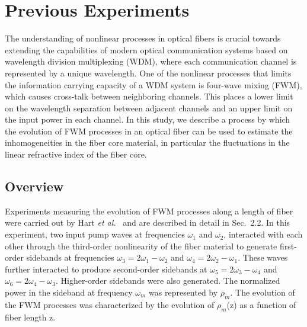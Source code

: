 \appendix
\renewcommand{\thechapter}{A}
\vspace*{-.85in}
\renewcommand{\chaptername}{Appendix}

\chapter{Previous Experiments}

The understanding of nonlinear processes in optical fibers is crucial towards
extending the capabilities of modern optical communication systems based on
wavelength division multiplexing (WDM), where each communication channel is
represented by a unique wavelength. One of the nonlinear processes that
limits the information carrying capacity of a WDM system is four-wave mixing
(FWM), which causes cross-talk between neighboring channels. This places a
lower limit on the wavelength separation between adjacent channels and an
upper limit on the input power in each channel. In this study, we describe
a process by which the evolution of FWM processes in an optical fiber can be
used to estimate the inhomogeneities in the fiber core material, in particular
the fluctuations in the linear refractive index of the fiber core.

\section{Overview}

Experiments measuring the evolution of FWM processes along a length of fiber
were carried out by Hart {\it et al.}\ \cite{hart1} and are described in detail in
Sec.\ 2.2. In this experiment, two input pump waves at frequencies
$\omega_1$ and $\omega_2$, interacted with each other through the third-order
nonlinearity of the fiber material to generate first-order sidebands at frequencies
$\omega_3 = 2\omega_1 - \omega_2$ and $\omega_4 = 2\omega_2 - \omega_1$.
These waves further interacted to produce second-order sidebands at
$\omega_5 = 2\omega_3 - \omega_4$ and $\omega_6 = 2\omega_4 - \omega_3$.
Higher-order sidebands were also generated. The normalized power in the
sideband at frequency $\omega_m$ was represented by $\rho_m$. The
evolution of the FWM processes was characterized by the evolution of
$\rho_m$(z) as a function of fiber length z.

